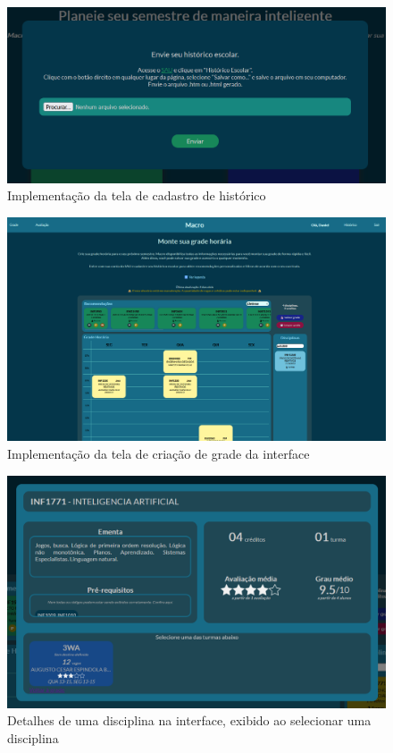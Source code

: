 \begin{figure}[ht]
    \begin{center}
    \includegraphics[width=360pt]{figuras/cadastro-historico.png}
    \caption{Implementação da tela de cadastro de histórico}
    \label{fig:tela-historico-impl}
    \end{center}
\end{figure}

\begin{figure}[ht]
    \begin{center}
    \includegraphics[width=360pt]{figuras/tela-grade.png}
    \caption{Implementação da tela de criação de grade da interface}
    \label{fig:tela-grade-impl}
    \end{center}
\end{figure}

\begin{figure}[ht]
    \begin{center}
    \includegraphics[width=360pt]{figuras/detalhe-turma.png}
    \caption{Detalhes de uma disciplina na interface, exibido ao selecionar uma disciplina}
    \label{fig:detalhe-turmas-impl}
    \end{center}
\end{figure}

